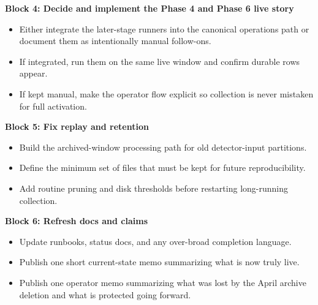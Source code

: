 \documentclass{article}
\begin{document}
\textbf{Block 4: Decide and implement the Phase 4 and Phase 6 live story}
\begin{itemize}
\item Either integrate the later-stage runners into the canonical operations path or document them as intentionally manual follow-ons.
\item If integrated, run them on the same live window and confirm durable rows appear.
\item If kept manual, make the operator flow explicit so collection is never mistaken for full activation.
\end{itemize}

\textbf{Block 5: Fix replay and retention}
\begin{itemize}
\item Build the archived-window processing path for old detector-input partitions.
\item Define the minimum set of files that must be kept for future reproducibility.
\item Add routine pruning and disk thresholds before restarting long-running collection.
\end{itemize}

\textbf{Block 6: Refresh docs and claims}
\begin{itemize}
\item Update runbooks, status docs, and any over-broad completion language.
\item Publish one short current-state memo summarizing what is now truly live.
\item Publish one operator memo summarizing what was lost by the April archive deletion and what is protected going forward.
\end{itemize}
\end{document}
